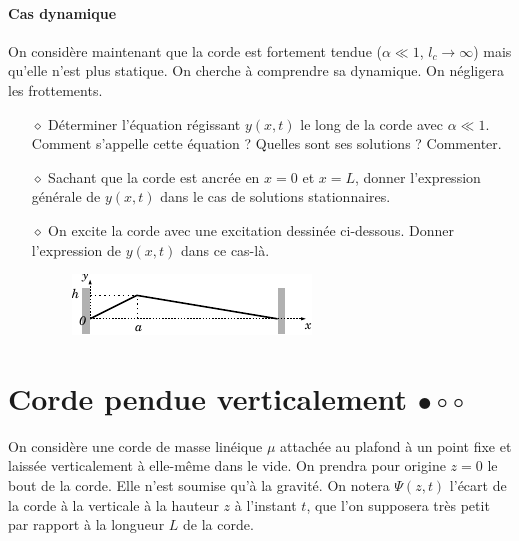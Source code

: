 \documentclass{report}
\begin{document}
\paragraph{Cas dynamique} On considère maintenant que la corde est fortement tendue ($\alpha\ll1$, $l_c\longrightarrow\infty$) mais qu'elle n'est plus statique. On cherche à comprendre sa dynamique. On négligera les frottements.

\begin{itemize}

	\item[$\diamond$] Déterminer l'équation régissant $y(x,t)$ le long de la corde avec $\alpha\ll1$. Comment s'appelle cette équation ? Quelles sont ses solutions ? Commenter.
	
	\item[$\diamond$] Sachant que la corde est ancrée en $x=0$ et $x=L$, donner l'expression générale de $y(x,t)$ dans le cas de solutions stationnaires. 
	
	\item[$\diamond$] On excite la corde avec une excitation dessinée ci-dessous. Donner l'expression de $y(x,t)$ dans ce cas-là.
	
	\begin{figure}[h!]
	\centering
		\includegraphics[scale=1.5]{onde2.pdf}
	\end{figure}

	
\end{itemize}

\newpage

\section*{Corde pendue verticalement $\bullet\circ\circ$}

On considère une corde de masse linéique $\mu$ attachée au plafond à un point fixe et laissée verticalement à elle-même dans le vide. On prendra pour origine $z=0$ le bout de la corde. Elle n'est soumise qu'à la gravité. On notera $\Psi(z,t)$ l'écart de la corde à la verticale à la hauteur $z$ à l'instant $t$, que l'on supposera très petit par rapport à la longueur $L$ de la corde.
\end{document}
